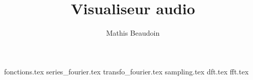 \documentclass{article}
\title{\textbf{Visualiseur audio}}
\author{Mathis Beaudoin}
\date{}
\numberwithin{equation}{section}
\begin{document}

\maketitle
\clearpage

\tableofcontents
\clearpage


\newpage
{}
\setcounter{page}{1}

{fonctions.tex}
{series_fourier.tex}
{transfo_fourier.tex}
{sampling.tex}
{dft.tex}
{fft.tex}


\newpage
\nocite{*}
 

\end{document}
